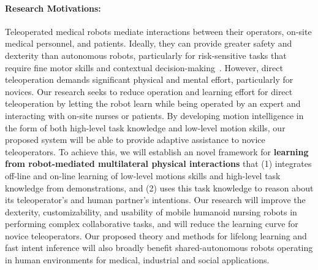 \documentclass[letterpaper, 11 pt, onecolumn]{article}
\begin{document}
\paragraph*{Research Motivations:} 
Teleoperated medical robots mediate interactions between their operators, on-site medical personnel, and patients.
Ideally, they can provide greater safety and dexterity than autonomous robots, particularly for risk-sensitive tasks that require fine motor skills and contextual decision-making~\cite{taylor2016medical}.
However, direct teleoperation demands significant physical and mental effort, particularly for novices.
Our research seeks to reduce operation and learning effort for direct teleoperation by letting the robot learn while being operated by an expert and interacting with on-site nurses or patients. 
By developing motion intelligence in the form of both high-level task knowledge and low-level motion skills, our proposed system will be able to provide adaptive assistance to novice teleoperators.
To achieve this, we will establish an novel framework for \textbf{learning from robot-mediated multilateral physical interactions} that (1) integrates off-line and on-line learning of low-level motions skills and high-level task knowledge from demonstrations, and (2) uses this task knowledge to reason about its teleoperator's and human partner's intentions.
Our research will improve the dexterity, customizability, and usability of mobile humanoid nursing robots in performing complex collaborative tasks, and will reduce the learning curve for novice teleoperators.
Our proposed theory and methods for lifelong learning and fast intent inference will also broadly benefit shared-autonomous robots operating in human environments for medical, industrial and social applications. 
\end{document}
